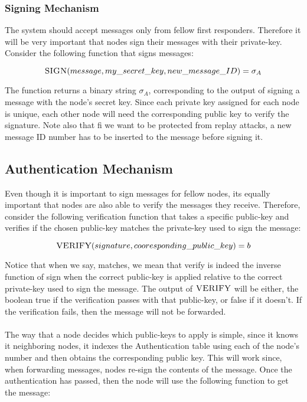 \documentclass[letterpaper]{article}
\begin{document}
\subsubsection{Signing Mechanism}

The system should accept messages only from fellow first responders. 
Therefore it will be very important that nodes sign their messages with their private-key. 
Consider the following function that signs messages:

$$\textsc{SIGN}(message, my\_secret\_key, new\_message\_ID) = \sigma_{A}$$

The function returns a binary string $\sigma_{A}$, corresponding to the output of signing a message with the node's secret key. Since each private key assigned for each node is unique, each other node will need the corresponding public key to verify the signature. Note also that fi we want to be protected from replay attacks, a new message ID number has to be inserted to the message before signing it.

\subsection{Authentication Mechanism}
Even though it is important to sign messages for fellow nodes, its equally important that nodes are also able to verify the messages they receive. 
Therefore, consider the following verification function that takes a specific public-key and verifies if the chosen public-key matches the private-key used to sign the message:

$$\textsc{VERIFY}(signature, cooresponding\_public\_key) =  b $$

Notice that when we say, matches, we mean that verify is indeed the inverse function of sign when the correct public-key is applied relative to the correct private-key used to sign the message.
The output of $\textsc{VERIFY}$ will be either, the boolean true if the verification passes with that public-key, or false if it doesn't. If the verification fails, then the message will not be forwarded. 
\\
\\
The way that a node decides which public-keys to apply is simple, since it knows it neighboring nodes, it indexes the Authentication table using each of the node's number and then obtains the corresponding public key.
This will work since, when forwarding messages, nodes re-sign the contents of the message.
Once the authentication has passed, then the node will use the following function to get the message:
\end{document}
